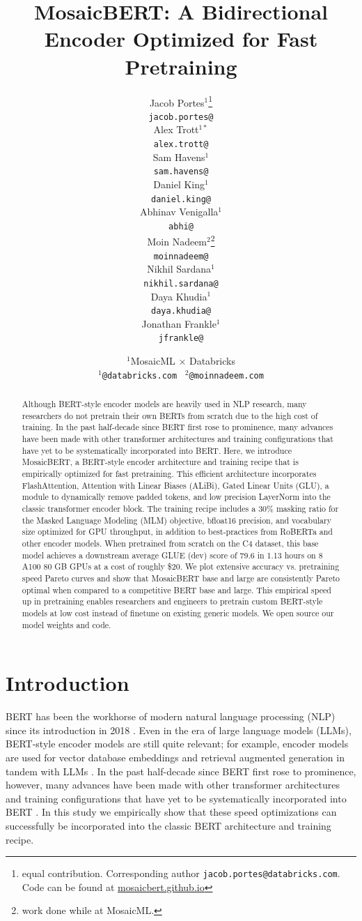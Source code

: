 \documentclass{article}
\title{MosaicBERT: A Bidirectional Encoder Optimized for Fast Pretraining}
\author{%
  Jacob Portes$^1$\thanks{equal contribution. Corresponding author \texttt{jacob.portes@databricks.com}. Code can be found at \href{https://mosaicbert.github.io}{\url{mosaicbert.github.io}}} \\
  \texttt{jacob.portes@}\\
  \And
  Alex Trott$^{1*}$ \\
  \texttt{alex.trott@} \\
  \And
  Sam Havens$^1$ \\
  \texttt{sam.havens@} \\
  \And
  Daniel King$^1$ \\
  \texttt{daniel.king@} \\
  \And
  Abhinav Venigalla$^1$ \\
  \texttt{abhi@} \\
  \And
  Moin Nadeem$^2$\thanks{work done while at MosaicML.} \\
  \texttt{moinnadeem@} \\
  \And
  Nikhil Sardana$^1$ \\
  \texttt{nikhil.sardana@} \\
  \And
  Daya Khudia$^1$ \\
  \texttt{daya.khudia@} \\
  \And
  Jonathan Frankle$^1$ \\
  \texttt{jfrankle@} \\
  \and
  $^1$MosaicML $\times$ Databricks \\
  $^1$\texttt{@databricks.com} \ $^2$\texttt{@moinnadeem.com}\\
}
\begin{document}
\maketitle

\begin{abstract}
Although BERT-style encoder models are heavily used in NLP research, many researchers do not pretrain their own BERTs from scratch due to the high cost of training.
% 
In the past half-decade since BERT first rose to prominence, many advances have been made with other transformer architectures and training configurations that have yet to be systematically incorporated into BERT.
% 
Here, we introduce MosaicBERT, a BERT-style encoder architecture and training recipe that is empirically optimized for fast pretraining.
% 
This efficient architecture incorporates FlashAttention, Attention with Linear Biases (ALiBi), Gated Linear Units (GLU), a module to dynamically remove padded tokens, and low precision LayerNorm into the classic transformer encoder block.
% 
The training recipe includes a 30\% masking ratio for the Masked Language Modeling (MLM) objective, bfloat16 precision, and vocabulary size optimized for GPU throughput, in addition to best-practices from RoBERTa and other encoder models.
% 
When pretrained from scratch on the C4 dataset, this base model achieves a downstream average GLUE (dev) score of 79.6 in 1.13 hours on 8 A100 80 GB GPUs at a cost of roughly \$20.
% 
We plot extensive accuracy vs. pretraining speed Pareto curves and show that MosaicBERT base and large are consistently Pareto optimal when compared to a competitive BERT base and large.
% 
This empirical speed up in pretraining enables researchers and engineers to pretrain custom BERT-style models at low cost instead of finetune on existing generic models. 
We open source our model weights and code.
\end{abstract}



\section{Introduction}


BERT has been the workhorse of modern natural language processing (NLP) since its introduction in 2018 \citep{devlin2018bert}. 
Even in the era of large language models (LLMs), BERT-style encoder models are still quite relevant; for example, encoder models are used for vector database embeddings and retrieval augmented generation in tandem with LLMs \citep{karpukhin2020dense,lewis2020retrieval,izacard2022unsupervised,wang2022text,shi2023replug}.
In the past half-decade since BERT first rose to prominence, however, many advances have been made with other transformer architectures and training configurations that have yet to be systematically incorporated into BERT \citep{dauphin2017language,press2021train,dao2022flashattention}. In this study we empirically show that these speed optimizations can successfully be incorporated into the classic BERT architecture and training recipe.
\end{document}
